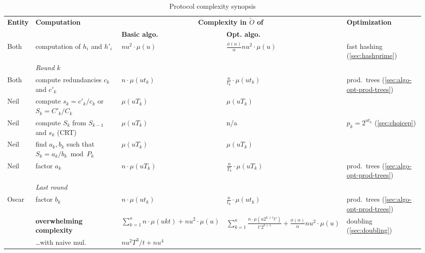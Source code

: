 \documentclass{llncs}
\newcommand{\Oapp}{\ensuremath{\tilde{O}}}
\begin{document}
\begin{table}[ht]
  \centering
  \caption{Protocol complexity synopsis}
  \label{tab:workload}
 \begin{threeparttable}
  \begin{tabularx}{\textwidth}{lXC{3cm}C{3cm}l}
\toprule
{\bf \hfill Entity \hfill \null} & {\bf \hfill Computation \hfill \null} &  \multicolumn{2}{c}{{\bf Complexity in $\Oapp$ of}} & {\bf \hfill Optimization \hfill \null} \\
\cmidrule(lr){3-4}
& & {\bf Basic algo.} & {\bf Opt. algo.} \\
\midrule
Both  & computation of $h_i$ and $h'_i$ 
      & $n u^2 \cdot \mu(u)$ 
      & $\frac{\phi(\alpha)}{\alpha} n u^2 \cdot \mu(u)$
      & fast hashing (\ref{sec:hashprime}) \\
\midrule
      & \textit{Round $k$} &  &  \\
Both  & compute redundancies $c_k$ and $c'_k$ 
      & $n \cdot \mu(ut_k)$ 
      & $\frac{n}{t_k} \cdot \mu(ut_k)$
      & prod.\ trees (\ref{sec:algo-opt-prod-trees}) \\
Neil  & compute ${s_k = c'_k/c_k}$ or ${S_k = C'_k / C_k}$
      & $\mu(uT_k)$
      & $\mu(uT_k)$
      &   \\
Neil  & compute $S_k$ from $S_{k-1}$ and $s_k$ (CRT)
      & $\mu(u T_k)$ 
      & n/a
      & $p_k = 2^{ut_k}$ (\ref{sec:choicep}) \\
Neil  & find $a_k,b_k$ such that ${S_k = a_k/b_k \bmod P_k}$
      & $\mu(u T_k)$
      & $\mu(u T_k)$
      & \\
Neil  & factor $a_k$
      & $n \cdot \mu(uT_k)$ 
      & $\frac{n}{T_k} \cdot \mu(uT_k)$
      & prod.\ trees (\ref{sec:algo-opt-prod-trees})  \\
\midrule
      & \textit{Last round} \\
Oscar & factor $b_k$
      & $n \cdot \mu(ut_k)$ 
      & $\frac{n}{t_k} \cdot \mu(ut_k)$
      & prod.\ trees (\ref{sec:algo-opt-prod-trees}) \\
\midrule
      & \textbf{overwhelming complexity}
      & $\sum_{k=1}^\kappa n \cdot \mu(ukt) + n u^2 \cdot \mu(u)$
      & $\sum_{k=1}^\kappa \frac{n \cdot \mu(u2^{k+1}t')}{t'2^{k+1}} + \frac{\phi(\alpha)}{\alpha} n u^2 \cdot \mu(u)  $
      & doubling (\ref{sec:doubling}) \\
      & \dots with naive mul.
      & $n u^2 T^3 / t + n u^4$

\end{tabularx}
\end{threeparttable}
\end{table}
\end{document}
